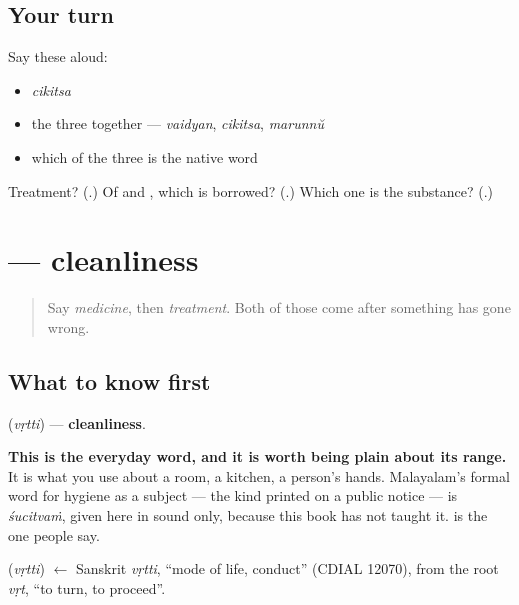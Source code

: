 \subsection*{Your turn}
Say these aloud:

\begin{itemize}
\raggedright
  \item \emph{cikitsa}
  \item the three together — \emph{vaidyan}, \emph{cikitsa}, \emph{marunnŭ}
  \item which of the three is the native word
\end{itemize}

\begin{tcolorbox}[breakable,colback=teal!4,colframe=teal!35!black,title={Before you move on}]
Treatment? (\textbf{}.) Of \textbf{} and \textbf{}, which is borrowed? (\textbf{}.) Which one is the substance? (\textbf{}.)
\end{tcolorbox}
\section[\texorpdfstring{\ml{വൃത്തി} (vṛtti)}{വൃത്തി (vṛtti)}]{ — cleanliness}

\label{lesson:ML-C107-vrtthi}



\begin{quote}
Say \emph{medicine}, then \emph{treatment}. Both of those come after something has gone wrong.
\end{quote}

\subsection*{What to know first}
\textbf{} (\emph{vṛtti}) — \textbf{cleanliness}.

\textbf{This is the everyday word, and it is worth being plain about its range.} It is what you use about a room, a kitchen, a person's hands. Malayalam's formal word for hygiene as a subject — the kind printed on a public notice — is \emph{śucitvaṁ}, given here in sound only, because this book has not taught it. \textbf{} is the one people say.

\begin{cousinweb}
\textbf{} (\emph{vṛtti}) $\leftarrow$ Sanskrit \emph{vṛtti}, \textquotedblleft{}mode of life, conduct\textquotedblright{} (CDIAL 12070), from the root \emph{vṛt}, \textquotedblleft{}to turn, to proceed\textquotedblright{}.
\end{cousinweb}

